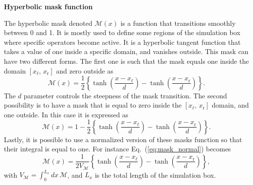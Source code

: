 \documentclass[11pt]{article}
\begin{document}
\begin{center}
    \LARGE \textbf{Hyperbolic mask function} \\
    \vspace{0.8cm} 
\end{center}

The hyperbolic mask denoted $\mathcal{M}(x)$ is a function that transitions smoothly between 0 and 1. It is mostly used to define some regions of the simulation box where specific operators become active. It is a hyperbolic tangent function that takes a value of one inside a specific domain, and vanishes outside. This mask can have two different forms. The first one is such that the mask equals one inside the domain  $\left[ x_\mathrm{\ell}, \, x_\mathrm{r} \right] $ and zero outside as
%
\begin{equation}\label{eq:mask_normal}
     \mathcal{M}(x) = \dfrac{1}{2}\left\{ \operatorname{tanh}{\left(\dfrac{x-x_\mathrm{\ell}}{d}\right)} - \operatorname{tanh}{\left(\dfrac{x-x_\mathrm{r}}{d}\right)}  \right\} .
\end{equation}
%
The $d$ parameter controls the steepness of the mask transition. The second possibility is to have a mask that is equal to zero inside the $\left[ x_\mathrm{\ell}, \, x_\mathrm{r} \right] $ domain, and one outside. In this case it is expressed as
%
\begin{equation}\label{eq:mask_inverted}
     \mathcal{M}(x) = 1 - \dfrac{1}{2}\left\{ \operatorname{tanh}{\left(\dfrac{x-x_\mathrm{\ell}}{d}\right)} - \operatorname{tanh}{\left(\dfrac{x-x_\mathrm{r}}{d}\right)}  \right\} .
\end{equation}
%
Lastly, it is possible to use a normalized version of these masks function so that their integral is equal to one. For instance Eq.~(\ref{eq:mask_normal}) becomes  
%
\begin{equation*}\label{eq:mask_nmz}
     \mathcal{M}(x) = \dfrac{1}{2V_\mathcal{M}}\left\{ \operatorname{tanh}{\left(\dfrac{x-x_\mathrm{\ell}}{d}\right)} - \operatorname{tanh}{\left(\dfrac{x-x_\mathrm{r}}{d}\right)}  \right\},
\end{equation*}
%
with $V_\mathcal{M} = \int_{0}^{L_x} d x \, \mathcal{M}$, and $L_x$ is the total length of the simulation box.
\end{document}
